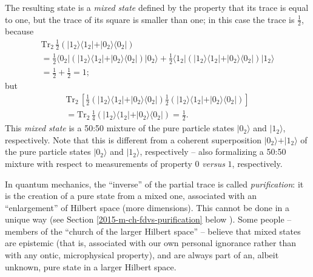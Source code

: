 {The resulting state is a
{\em mixed state}
defined by the property that its trace is equal to one,
but the trace of its square is smaller than one; in this case the trace is $\frac{1}{2}$, because
\begin{equation}
\begin{split}
\textrm{Tr}_2\,
\frac{1}{2}
\left(
\vert 1_2 \rangle \langle   1_2 \vert
+
\vert 0_2 \rangle \langle   0_2 \vert
\right) \\
= \frac{1}{2}  \langle 0_2 \vert
\left(
\vert 1_2 \rangle \langle   1_2 \vert
+
\vert 0_2 \rangle \langle   0_2 \vert
\right)
\vert 0_2 \rangle
+  \frac{1}{2}
\langle 1_2  \vert
\left(
\vert 1_2 \rangle \langle   1_2 \vert
+
\vert 0_2 \rangle \langle   0_2 \vert
\right)
\vert 1_2 \rangle  \\
=  \frac{1}{2} + \frac{1}{2} =1;
\end{split}
\end{equation}
but
\begin{equation}
\begin{split}
\textrm{Tr}_2\,
\left[
\frac{1}{2}
\left(
\vert 1_2 \rangle \langle   1_2 \vert
+
\vert 0_2 \rangle \langle   0_2 \vert
\right)
\frac{1}{2}
\left(
\vert 1_2 \rangle \langle   1_2 \vert
+
\vert 0_2 \rangle \langle   0_2 \vert
\right)
\right]
\\ =
\textrm{Tr}_2\,
\frac{1}{4}
\left(
\vert 1_2 \rangle \langle   1_2 \vert
+
\vert 0_2 \rangle \langle   0_2 \vert
\right)
= \frac{1}{2}.
\end{split}
\end{equation}
This {\em mixed state} is a 50:50 mixture of the pure particle states  $\vert 0_2 \rangle$ and $\vert 1_2 \rangle$, respectively.
Note that this is different from
a coherent superposition
$\vert 0_2 \rangle + \vert 1_2 \rangle$
 of the pure particle states  $\vert 0_2 \rangle$ and $\vert 1_2 \rangle$, respectively --
also formalizing a 50:50 mixture with respect to measurements of property $0$ {\it versus} $1$, respectively.

\eexample
}

In quantum mechanics, the ``inverse'' of the partial trace is called
{\em purification}:
it is the creation of a pure state from a mixed one,
associated with an ``enlargement'' of Hilbert space (more dimensions).
This cannot be done in a unique way (see Section \ref{2015-m-ch-fdvs-purification} below
 ).
Some people -- members of the ``church of the larger Hilbert space'' --
believe that mixed states are epistemic (that is, associated with our own personal ignorance rather than with
any ontic, microphysical property), and are always part of an, albeit unknown, pure state in a larger Hilbert space.

